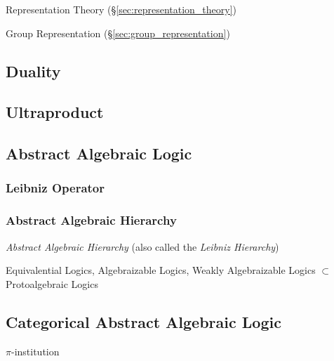 Representation Theory (\S\ref{sec:representation_theory})

Group Representation (\S\ref{sec:group_representation})




\subsection{Duality}\label{sec:duality}

\subsection{Ultraproduct}\label{sec:ultraproducts}

\subsection{Abstract Algebraic Logic}
\label{sec:abstract_algebraic_logic}

\subsubsection{Leibniz Operator}\label{sec:leibniz_operator}



\subsubsection{Abstract Algebraic Hierarchy}\label{sec:leibniz_hierarchy}

\emph{Abstract Algebraic Hierarchy} (also called the \emph{Leibniz
  Hierarchy})

Equivalential Logics, Algebraizable Logics, Weakly Algebraizable
Logics $\subset$ Protoalgebraic Logics



\subsection{Categorical Abstract Algebraic Logic}
\label{sec:categorical_abstract}

$\pi$-institution
